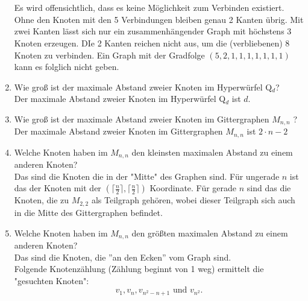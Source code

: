 \begin{enumerate}[label=(\alph*)]
\\\\
        Es wird offensichtlich, dass es keine Möglichkeit zum Verbinden existiert. Ohne den Knoten mit 
        den 5 Verbindungen bleiben genau 2 Kanten übrig. Mit zwei Kanten lässt sich nur ein zusammenhängender 
        Graph mit höchstens 3 Knoten erzeugen. DIe 2 Kanten reichen nicht aus, um die 
        (verbliebenen) 8 Knoten zu verbinden. Ein Graph mit der Gradfolge $(5,2,1,1,1,1,1,1,1)$ kann es 
        folglich nicht geben. 
         
        \item Wie groß ist der maximale Abstand zweier Knoten im Hyperwürfel Q$_d$? \\
        Der maximale Abstand zweier Knoten im Hyperwürfel Q$_d$ ist $d$.
        
        \item Wie groß ist der maximale Abstand zweier Knoten im Gittergraphen $M_{n,n}$ ? \\
        Der maximale Abstand zweier Knoten im Gittergraphen $M_{n,n}$ ist $2\cdot n - 2$
        
        \item Welche Knoten haben im $M_{n,n}$ den kleinsten maximalen Abstand zu einem anderen Knoten? \\
        Das sind die Knoten die in der "Mitte" des Graphen sind. Für ungerade $n$ ist das der Knoten mit der
        $(\big\lceil\frac{n}{2}\big\rceil,\big\lceil\frac{n}{2}\big\rceil)$ Koordinate. 
        Für gerade $n$ sind das die Knoten, die zu $M_{2,2}$ als Teilgraph gehören, wobei dieser Teilgraph 
        sich auch in die Mitte des Gittergraphen befindet.
        
        \item Welche Knoten haben im $M_{n,n}$ den größten maximalen Abstand zu einem anderen Knoten? \\
        Das sind die Knoten, die ''an den Ecken'' vom Graph sind. \\
        Folgende Knotenzählung (Zählung beginnt von 1 weg) ermittelt die "gesuchten Knoten":
        $$v_1, v_n, v_{n^2-n+1} \text{ und } v_{n^2}.$$
        

\end{enumerate}
